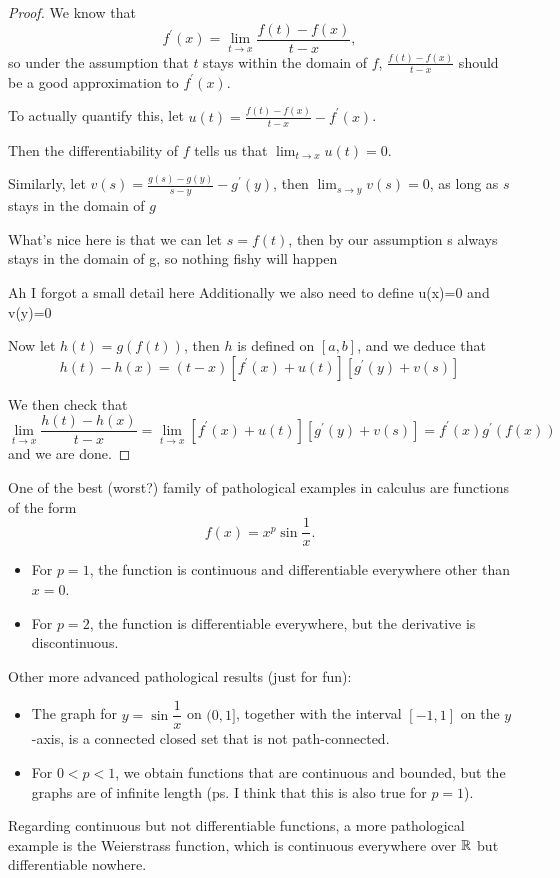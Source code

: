 \begin{proof}
We know that
\[ f^\prime(x)=\lim_{t\to x}\frac{f(t)-f(x)}{t-x}, \]
so under the assumption that $t$ stays within the domain of $f$, $\frac{f(t)-f(x)}{t-x}$ should be a good approximation to $f^\prime(x)$.

To actually quantify this, let $u(t)=\frac{f(t)-f(x)}{t-x}-f^\prime(x)$.

Then the differentiability of $f$ tells us that $\lim_{t\to x}u(t)=0$.

Similarly, let $v(s)=\frac{g(s)-g(y)}{s-y}-g^\prime(y)$, then $\lim_{s\to y}v(s)=0$, as long as $s$ stays in the domain of $g$

What's nice here is that we can let $s=f(t)$, then by our assumption s always stays in the domain of g, so nothing fishy will happen

Ah I forgot a small detail here
Additionally we also need to define u(x)=0 and v(y)=0

Now let $h(t)=g(f(t))$, then $h$ is defined on $[a,b]$, and we deduce that
\[ h(t)-h(x)=(t-x)[f^\prime(x)+u(t)][g^\prime(y)+v(s)] \]

We then check that
\[ \lim_{t\to x}\frac{h(t)-h(x)}{t-x} = \lim_{t\to x}[f^\prime(x)+u(t)][g^\prime(y)+v(s)] = f^\prime(x)g^\prime(f(x)) \]
and we are done.
\end{proof}






\begin{example}
One of the best (worst?) family of pathological examples in calculus are functions of the form
\[ f(x)=x^p\sin\frac{1}{x}. \]
\begin{itemize}
\item For $p=1$, the function is continuous and differentiable everywhere other than $x=0$.
\item For $p=2$, the function is differentiable everywhere, but the derivative is discontinuous.
\end{itemize}

Other more advanced pathological results (just for fun):
\begin{itemize}
\item The graph for $y=\sin\dfrac{1}{x}$ on $(0,1]$, together with the interval $[-1,1]$ on the $y$-axis, is a connected closed set that is not path-connected.
\item For $0<p<1$, we obtain functions that are continuous and bounded, but the graphs are of infinite length (ps. I think that this is also true for $p=1$).
\end{itemize}
Regarding continuous but not differentiable functions, a more pathological example is the Weierstrass function, which is continuous everywhere over $\mathbb R$ but differentiable nowhere.
\end{example}

